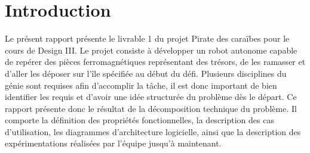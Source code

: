\chapter{Introduction}
Le présent rapport présente le livrable 1 du projet Pirate des caraïbes pour le cours de Design III.
Le projet consiste à développer un robot autonome capable de repérer des pièces ferromagnétiques représentant des trésors,
de les ramasser et d'aller les déposer sur l'île spécifiée au début du défi. Plusieurs disciplines du génie sont requises afin d'accomplir la tâche,
il est donc important de bien identifier les requis et d'avoir une idée structurée du problème dès le départ. Ce rapport présente donc le résultat de la décomposition technique du problème.
Il comporte la définition des propriétés fonctionnelles, la description des cas d'utilisation, les diagrammes d'architecture logicielle, ainsi que la description des expérimentations réalisées
par l'équipe jusqu'à maintenant.
